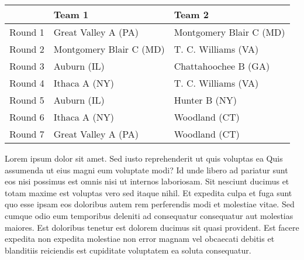 \documentclass{article}%
\begin{document}
\begin{tabularx}{\textwidth}{|c|Y|Y|}%
\hline%
&Team 1&Team 2\\%
\hline%
Round 1&Great Valley A (PA)&Montgomery Blair C (MD)\\%
Round 2&Montgomery Blair C (MD)&T. C. Williams (VA)\\%
Round 3&Auburn (IL)&Chattahoochee B (GA)\\%
Round 4&Ithaca A (NY)&T. C. Williams (VA)\\%
Round 5&Auburn (IL)&Hunter B (NY)\\%
Round 6&Ithaca A (NY)&Woodland (CT)\\%
Round 7&Great Valley A (PA)&Woodland (CT)\\%
\hline%
\end{tabularx}%
\vspace*{8pt}%
\linebreak%
\newline%
Lorem ipsum dolor sit amet. Sed iusto reprehenderit ut quis voluptas ea Quis assumenda ut eius magni eum voluptate modi? Id unde libero ad pariatur sunt eos nisi possimus est omnis nisi ut internos laboriosam. Sit nesciunt ducimus et totam maxime est voluptas vero sed itaque nihil. Et expedita culpa et fuga sunt quo esse ipsam eos doloribus autem rem perferendis modi et molestiae vitae.\newline%
\newline%
Sed cumque odio eum temporibus deleniti ad consequatur consequatur aut molestias maiores. Est doloribus tenetur est dolorem ducimus sit quasi provident. Est facere expedita non expedita molestiae non error magnam vel obcaecati debitis et blanditiis reiciendis est cupiditate voluptatem ea soluta consequatur.%
\newpage%
\end{document}
